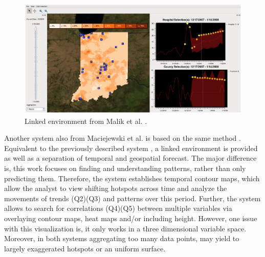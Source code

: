 \documentclass[electronic]{vgtc}             %
\begin{document}
\begin{figure}[b]
	\centering
	\includegraphics[width=\columnwidth]{Hotspot}
	\caption{Linked environment from Malik et al. \cite{maciejewski:2011}. 
	}
	\label{fig:hotspot}
\end{figure}

Another system also from Maciejewski et al. \cite{maciejewski:2010} is based on the same method .
Equivalent to the previously described system \cite{maciejewski:2011}, a linked environment is provided as well as a separation of temporal and geospatial forecast.
The major difference is, this work focuses on finding and understanding patterns, rather than only predicting them.
Therefore, the system establishes temporal contour maps, which allow the analyst to view shifting hotspots across time and analyze the movements of trends (Q2)(Q3) and patterns over this period.
Further, the system allows to search for correlations (Q4)(Q5) between multiple variables via overlaying contour maps, heat maps and/or including height. 
However, one issue with this visualization is, it only works in a three dimensional variable space.
Moreover, in both systems aggregating too many data points, may yield to largely exaggerated hotspots or an uniform surface. 
\end{document}
